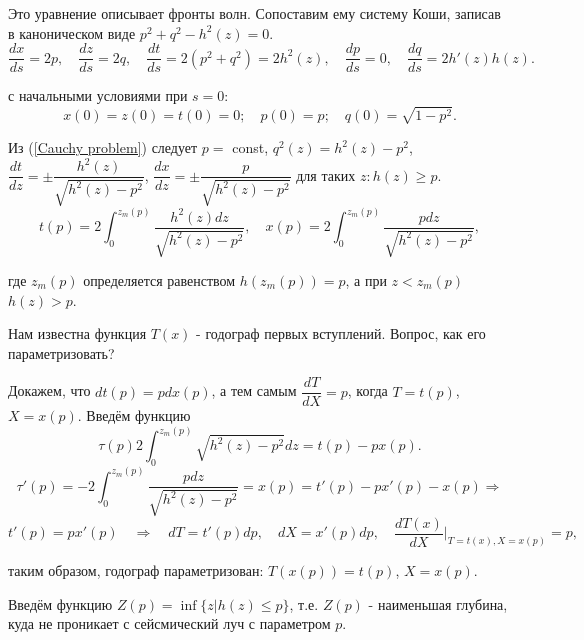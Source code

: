 \documentclass{article}
\begin{document}
Это уравнение описывает фронты волн.
Сопоставим ему систему Коши, записав в каноническом виде $p^2 + q^2 - h^2(z) = 0$.
\begin{equation}
	\dfrac{dx}{ds} = 2p, \quad 
	\dfrac{dz}{ds} = 2q, \quad
	\dfrac{dt}{ds} = 2(p^2 + q^2) = 2h^2(z), \quad
	\dfrac{dp}{ds} = 0, \quad
	\dfrac{dq}{ds} = 2h'(z) h(z).
	\label{Cauchy problem}
\end{equation}

с начальными условиями при $s=0$:
\begin{equation*}
	x(0) = z(0) = t(0) = 0; \quad
	p(0) = p; \quad
	q(0) = \sqrt{1 - p^2}.
\end{equation*}

Из (\ref{Cauchy problem}) следует 
$p =$ const,
$ q^2(z) = h^2(z) - p^2$,
$\dfrac{dt}{dz} = \pm \dfrac{h^2(z)}{\sqrt{h^2(z) - p^2}}$,
$\dfrac{dx}{dz} = \pm \dfrac{p}{\sqrt{h^2(z) - p^2}}$ 
для таких $z: h(z) \geqslant p$. 
\begin{equation}
	t(p) = 2 \int_0^{z_m(p)} \dfrac{h^2(z) dz}{\sqrt{h^2(z) - p^2}}, \quad
	x(p) = 2 \int_0^{z_m(p)} \dfrac{p dz}{\sqrt{h^2(z) - p^2}},
	\label{parametrization}
\end{equation}

где $z_m(p)$ определяется равенством $h(z_m(p)) = p$, а при $z < z_m(p)$ $h(z) > p$.

Нам известна функция $T(x)$ - годограф первых вступлений. Вопрос, как его параметризовать?

Докажем, что $dt(p) = p dx(p)$, а тем самым $\dfrac{dT}{dX} = p$, когда $T = t(p)$, $X = x(p)$. Введём функцию
\begin{equation*}
	\tau(p) 2 \int_0^{z_m(p)} \sqrt{h^2(z) - p^2} dz = t(p) - px(p).
\end{equation*}
\begin{equation*}
	\tau'(p) = -2 \int_0^{z_m(p)} \dfrac{p dz}{\sqrt{h^2(z) - p^2}} = x(p) =  t'(p) - px'(p) - x(p) \Rightarrow
\end{equation*}
\begin{equation*}
	t'(p) = p x'(p) \quad \Rightarrow \quad
	dT = t'(p)dp, \quad dX = x'(p) dp, \quad
	\dfrac{dT(x)}{dX} \bigg|_{T = t(x), X = x(p)} = p,
\end{equation*}

таким образом, годограф параметризован: $T(x(p)) = t(p)$, $X = x(p)$.

Введём функцию $Z(p) = \inf\{z | h(z) \leqslant p\}$, т.е. $Z(p)$ - наименьшая глубина, куда не проникает с сейсмический луч с параметром $p$.
\end{document}
